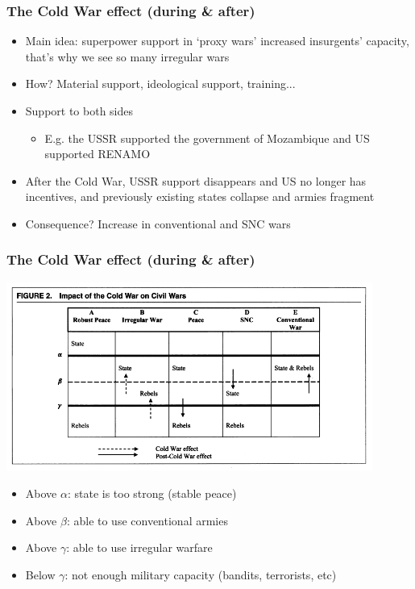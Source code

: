 \documentclass[aspectratio=43]{beamer}
\begin{document}
\begin{frame}
\frametitle{The Cold War effect (during \& after)}
\centering

\begin{itemize}
  \item Main idea: superpower support in `proxy wars' increased insurgents' capacity, that's why we see so many irregular wars
  \item How? Material support, ideological support, training...
  \item Support to both sides
  \begin{itemize}
    \item E.g. the USSR supported the government of Mozambique and US supported RENAMO
  \end{itemize}
  \item<2-> After the Cold War, USSR support disappears and US no longer has incentives, and previously existing states collapse and armies fragment
  \item<2-> Consequence? Increase in conventional and SNC wars
\end{itemize}

\end{frame}


\begin{frame}
\frametitle{The Cold War effect (during \& after)}
\centering

\includegraphics[width = 0.9\textwidth]{img/kalyvas_balcells_cold_war}

\begin{itemize}
  \item Above $\alpha$: state is too strong (stable peace)
  \item Above $\beta$: able to use conventional armies
  \item Above $\gamma$: able to use irregular warfare
  \item Below $\gamma$: not enough military capacity (bandits, terrorists, etc)
\end{itemize}

\end{frame}
\end{document}
